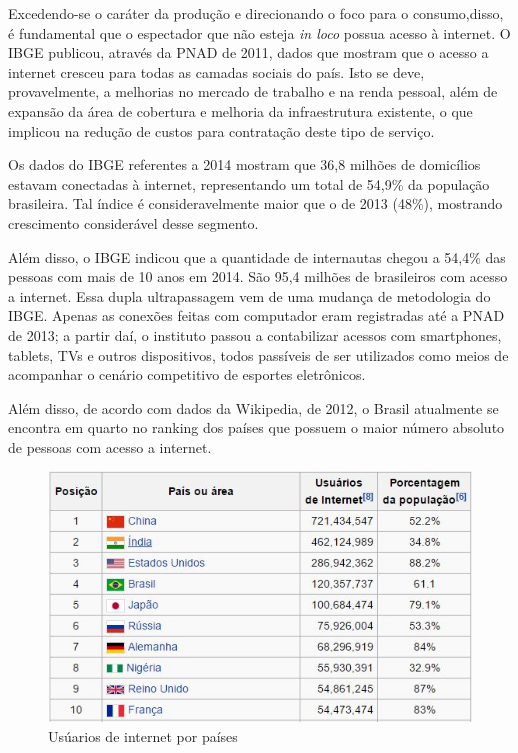 \documentclass[a4paper, 12pt]{paper}
\begin{document}
Excedendo-se o caráter da produção e direcionando o foco para o consumo,disso, é fundamental que o espectador que não esteja \textit{in loco} possua acesso à internet. O IBGE publicou, através da PNAD de 2011, dados que mostram que o acesso a internet cresceu para todas as camadas sociais do país. Isto se deve, provavelmente, a melhorias no mercado de trabalho e na renda pessoal, além de expansão da área de cobertura e melhoria da infraestrutura existente, o que implicou na redução de custos para contratação deste tipo de serviço.

Os dados do IBGE referentes a 2014 mostram que 36,8 milhões de domicílios estavam conectadas à internet, representando um total de 54,9\% da população brasileira. Tal índice é consideravelmente maior que o de 2013 (48\%), mostrando crescimento considerável desse segmento.

Além disso, o IBGE indicou que a quantidade de internautas chegou a 54,4\% das pessoas com mais de 10 anos em 2014. São 95,4 milhões de brasileiros com acesso a internet. Essa dupla ultrapassagem vem de uma mudança de metodologia do IBGE. Apenas as conexões feitas com computador eram registradas até a PNAD de 2013; a partir daí, o instituto passou a contabilizar acessos com smartphones, tablets, TVs e outros dispositivos, todos passíveis de ser utilizados como meios de acompanhar o cenário competitivo de esportes eletrônicos.

Além disso, de acordo com dados da Wikipedia, de 2012, o Brasil atualmente se encontra em quarto no ranking dos países que possuem o maior número absoluto de pessoas com acesso a internet.

\begin{figure}[!ht]
    \centering
    \includegraphics[scale=0.5]{img/img05.png}
    \caption{Us\'{u}arios de internet por pa\'{i}ses}
\end{figure}
\end{document}
